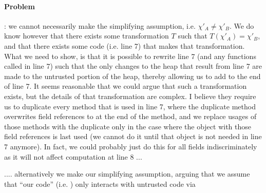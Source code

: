 \paragraph{Problem}: we cannot necessarily make the simplifying assumption, i.e. $\chi'_A \neq \chi'_B$.
We do know however that there exists some transformation $T$ such that $T(\chi'_A) = \chi'_B$,
and that there exists some code (i.e. line 7) that makes that transformation. What we need to show,
is that it is possible to rewrite line 7 (and any functions called in line 7) such that the only changes 
to the heap that result from line 7 are made to the untrusted portion of the heap, thereby allowing us 
to add  to the end of line 7. It seems reasonable that we could argue that such a transformation
exists, but the details of that transformation are complex. I believe they require us to duplicate every method
that is used in line 7, where the duplicate method overwrites field references to  at the end of the method, 
and we replace usages of those methods with the duplicate only in the case where the object with those field references
is last used (we cannot do it until that object is not needed in line 7 anymore). In fact, we could probably just do this for all fields indiscriminately as it will not affect computation
at line 8 ...

.... alternatively we make our simplifying assumption, arguing that we assume that ``our code'' (i.e. )
only interacts with untrusted code via 

